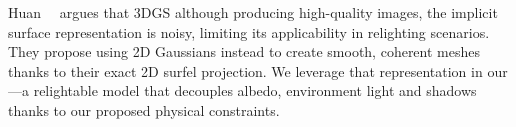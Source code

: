     Huan~\etal~\cite{huang20242d} argues that 3DGS although producing
    high-quality images, the implicit surface representation is noisy,
    limiting its applicability in relighting scenarios.
    They propose using 2D Gaussians instead to create smooth, coherent meshes
    thanks to their exact 2D surfel projection.
    We leverage that representation in our \lumigauss---a relightable model
    that decouples albedo, environment light and shadows thanks to our
    proposed physical constraints.

